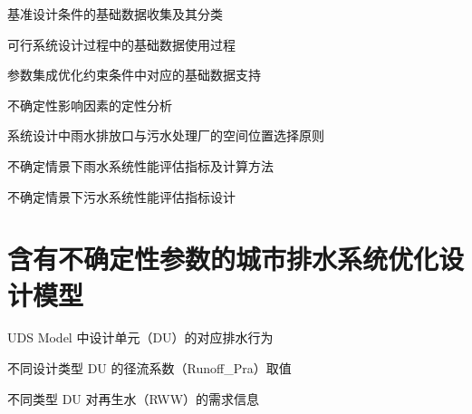 \documentclass[degree=doctor]{thuthesis}
\begin{document}
\clearpage
\setcounter{page}{46}
\begin{table}
  \centering
  \caption{基准设计条件的基础数据收集及其分类}
\end{table}

\clearpage
\setcounter{page}{47}
\begin{table}
  \centering
  \caption{可行系统设计过程中的基础数据使用过程}
\end{table}

\clearpage
\setcounter{page}{48}
\begin{table}
  \centering
  \caption{参数集成优化约束条件中对应的基础数据支持}
\end{table}

\clearpage
\setcounter{page}{51}
\begin{table}
  \centering
  \caption{不确定性影响因素的定性分析}
\end{table}

\clearpage
\setcounter{page}{55}
\begin{table}
  \centering
  \caption{系统设计中雨水排放口与污水处理厂的空间位置选择原则}
\end{table}

\clearpage
\setcounter{page}{60}
\begin{table}
  \centering
  \caption{不确定情景下雨水系统性能评估指标及计算方法}
\end{table}

\clearpage
\setcounter{page}{62}
\begin{table}
  \centering
  \caption{不确定情景下污水系统性能评估指标设计}
\end{table}


\chapter{含有不确定性参数的城市排水系统优化设计模型}

\clearpage
\setcounter{page}{68}
\begin{table}
  \centering
  \caption{UDS Model 中设计单元（DU）的对应排水行为}
\end{table}

\clearpage
\setcounter{page}{70}
\begin{table}
  \centering
  \caption{不同设计类型 DU 的径流系数（Runoff\_Pra）取值}
\end{table}

\clearpage
\setcounter{page}{72}
\begin{table}
  \centering
  \caption{不同类型 DU 对再生水（RWW）的需求信息}
\end{table}
\end{document}
